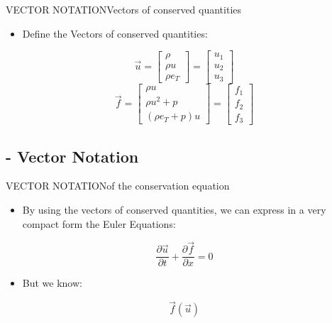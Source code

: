 \documentclass{beamer}
\begin{document}
\begin{frame}{VECTOR NOTATION}{Vectors of conserved quantities}
  \begin{itemize}
   \item Define the Vectors of conserved quantities:
  \end{itemize}
  \begin{equation}
    \vec{u} = \begin{bmatrix}
      {\rho} \\
      {\rho}{u} \\
      {\rho}{e_T}
    \end{bmatrix}=\begin{bmatrix}
      u_1\\ 
      u_2\\ 
      u_3
      \end{bmatrix}
  \end{equation}
  \begin{equation}
   \vec{f} = \begin{bmatrix}
      {\rho}{u} \\
      {\rho}{u^2}+p \\
      ({\rho}{e_T}+p)u
    \end{bmatrix}=\begin{bmatrix}
      f_1\\ 
      f_2\\ 
      f_3
      \end{bmatrix}
  \end{equation}
\end{frame}

\subsection{- Vector Notation} 

\begin{frame}{VECTOR NOTATION}{of the conservation equation}
  \begin{itemize}
   \item By using the vectors of conserved quantities, we can express in a very compact form the Euler Equations:
  \end{itemize}
  \begin{equation}
   \frac{\partial{\vec{u}}}{\partial{t}}+\frac{\partial{\vec{f}}}{\partial{x}}=0
  \end{equation}
  \begin{itemize}
  \item But we know:
  \end{itemize}
  \begin{equation}
  \vec{f}(\vec{u})
  \end{equation}
\end{frame}
\end{document}
